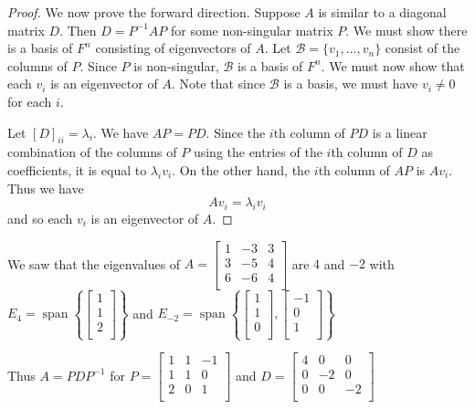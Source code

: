 \documentclass{article}
\DeclareMathOperator{\spn}{span}
\begin{document}
\begin{proof}
  We now prove the forward direction. Suppose $A$ is similar to a diagonal matrix $D$. Then $D = P^{-1}AP$ for some non-singular matrix $P$. We must show there is a basis of $F^n$ consisting of eigenvectors of $A$. Let $\mathcal{B} = \{v_1, \ldots, v_n\}$ consist of the columns of $P$. Since $P$ is non-singular, $\mathcal{B}$ is a basis of $F^n$. We must now show that each $v_i$ is an eigenvector of $A$. Note that since $\mathcal{B}$ is a basis, we must have $v_i \neq 0$ for each $i$.

  Let $[D]_{ii} = \lambda_i$. We have $AP = PD$. Since the $i$th column of $PD$ is a linear combination of the columns of $P$ using the entries of the $i$th column of $D$ as coefficients, it is equal to $\lambda_iv_i$. On the other hand, the $i$th column of $AP$ is $Av_i$. Thus we have \[
    Av_i = \lambda_iv_i
  \] and so each $v_i$ is an eigenvector of $A$.
\end{proof}
\begin{example}
  We saw that the eigenvalues of $A =
    \begin{bmatrix}
      1 & -3 & 3 \\
      3 & -5 & 4 \\
      6 & -6 & 4 \\
    \end{bmatrix}$ are $4$ and $-2$ with $E_4 = \spn \left\{
    \begin{bmatrix}
      1 \\1\\2\\
    \end{bmatrix}\right\}$ and $E_{-2} = \spn \left\{
    \begin{bmatrix}
      1 \\1\\0\\
    \end{bmatrix},
    \begin{bmatrix}
      -1 \\0\\1\\
    \end{bmatrix}\right\}$

  Thus $A = PDP^{-1}$ for $P =
    \begin{bmatrix}
      1 & 1 & -1 \\
      1 & 1 & 0  \\
      2 & 0 & 1  \\
    \end{bmatrix}$ and $D =
    \begin{bmatrix}
      4 & 0  & 0  \\
      0 & -2 & 0  \\
      0 & 0  & -2 \\
    \end{bmatrix}$
\end{example}
\end{document}
